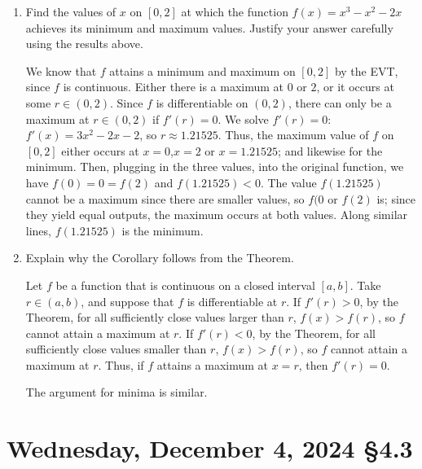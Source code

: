 \documentclass[12pt]{amsart}
\def\We{Wednesday}
\numberwithin{equation}{section}
\theoremstyle{plain} %
\newcommand{\Dec}[3]{\section{#2, December #1, 2024 \quad \S#3}}
\theoremstyle{definition}
\theoremstyle{remark}
\begin{document}
 \begin{enumerate}
 
 \item Find the values of $x$ on $[0,2]$ at which the function $f(x) = x^3-x^2-2x$ achieves its minimum and maximum values. Justify your answer carefully using the results above.
 
  \begin{framed}
  We know that $f$ attains a minimum and maximum on $[0,2]$ by the EVT, since $f$ is continuous. Either there is a maximum at $0$ or $2$, or it occurs at some $r\in (0,2)$. Since $f$ is differentiable on $(0,2)$, there can only be a maximum at $r\in (0,2)$ if $f'(r)=0$. We solve $f'(r)=0$: $f'(x)=3x^2-2x-2$, so $r\approx 1.21525$. Thus, the maximum value of $f$ on $[0,2]$ either occurs at $x=0$,$x=2$ or $x=1.21525$; and likewise for the minimum. Then, plugging in the three values, into the original function, we have $f(0)=0=f(2)$ and $f(1.21525)<0$. The value $f(1.21525)$ cannot be a maximum since there are smaller values, so $f(0$ or $f(2)$ is; since they yield equal outputs, the maximum occurs at both values. Along similar lines, $f(1.21525)$ is the minimum.
  \end{framed} 
 
 \item Explain why the Corollary follows from the Theorem.
 
  \begin{framed}
  Let $f$ be a function that is continuous on a closed interval $[a,b]$. Take $r\in (a,b)$, and suppose that $f$ is differentiable at $r$. If $f'(r)>0$, by the Theorem, for all sufficiently close values larger than $r$, $f(x)>f(r)$, so $f$ cannot attain a maximum at $r$. If $f'(r)<0$, by the Theorem, for all sufficiently close values smaller than $r$, $f(x)>f(r)$, so $f$ cannot attain a maximum at $r$. Thus, if $f$ attains a maximum at $x=r$, then $f'(r)=0$.
  
The argument for minima is similar.
    \end{framed} 
    
    
    \end{enumerate}
    
    
\newpage

	\Dec{4}{\We}{4.3}
	
\end{document}
